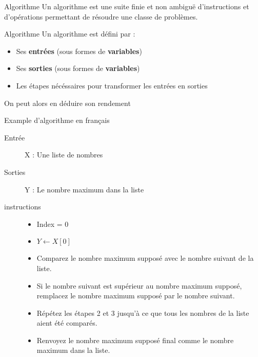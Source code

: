 \begin{frame}{Algorithme}
    Un algorithme est une suite finie et non ambiguë d'instructions et d’opérations permettant de résoudre une classe de problèmes.
\end{frame}

\begin{frame}{Algorithme}
    Un algorithme est défini par :
    \begin{itemize}
        \item Ses \textbf{entrées} (sous formes de \textbf{variables})
        \item Ses \textbf{sorties} (sous formes de \textbf{variables})
        \item Les étapes nécéssaires pour transformer les entrées en sorties
    \end{itemize}
    On peut alors en déduire son rendement
\end{frame}

\begin{frame}{Example d'algorithme en français}
    \begin{description}
        \item [Entrée] X : Une liste de nombres
        \item [Sorties] Y : Le nombre maximum dans la liste 
        \item [instructions]
        \begin{itemize}
            \item Index = 0
            \item $Y \leftarrow X[0]$ 
            \item  Comparez le nombre maximum supposé avec le nombre suivant de la liste.
            \item  Si le nombre suivant est supérieur au nombre maximum supposé, remplacez le nombre maximum supposé par le nombre suivant.
            \item  Répétez les étapes 2 et 3 jusqu'à ce que tous les nombres de la liste aient été comparés.
            \item  Renvoyez le nombre maximum supposé final comme le nombre maximum dans la liste.
        \end{itemize}
    \end{description}
\end{frame}



